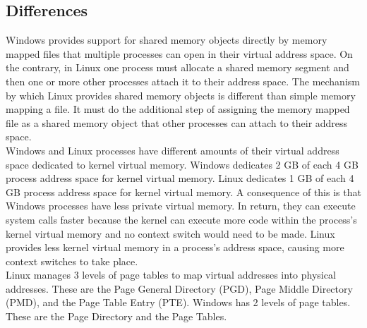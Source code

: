\documentclass[letterpaper,10pt,titlepage]{article}
\begin{document}
\subsection{Differences}
Windows provides support for shared memory objects directly by memory 
mapped files that multiple processes can open in their virtual address space.
On the contrary, in Linux one process must allocate a shared memory segment and
then one or more other processes attach it to their address space. The 
mechanism by which Linux provides shared memory objects is different than 
simple memory mapping a file. It must do the additional step of assigning the
memory mapped file as a shared memory object that other processes can attach
to their address space.
\\
\linebreak
Windows and Linux processes have different amounts of their virtual address
space dedicated to kernel virtual memory. Windows dedicates 2 GB of each 4 GB
process address space for kernel virtual memory. Linux dedicates 1 GB of each
4 GB process address space for kernel virtual memory. A consequence of this 
is that Windows processes have less private virtual memory. In return, they 
can execute system calls faster because the kernel can execute more code 
within the process's kernel virtual memory and no context switch would need to
be made. Linux provides less kernel virtual memory in a process's address 
space, causing more context switches to take place. 
\\ 
\linebreak
Linux manages 3 levels of page tables to map virtual addresses into physical
addresses. These are the Page General Directory (PGD), Page Middle Directory
(PMD), and the Page Table Entry (PTE). Windows has 2 levels of page tables. 
These are the Page Directory and the Page Tables.
\end{document}
